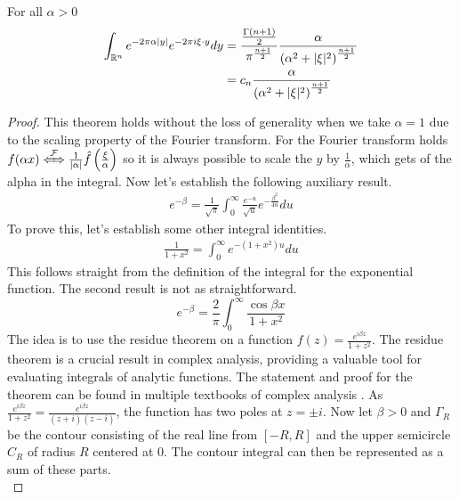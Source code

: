 \begin{theorem}\label{thm:poisson-kernel}
    For all $\alpha>0$ 
    \begin{align*}
        \int_{\mathbb R^{n}}e^{-2\pi\alpha|y|}e^{-2\pi i \xi\cdot y}dy &= \frac{\frac{\Gamma\left(n+1\right)}{2}}{\pi^{\frac{n+1}{2}}}\frac{\alpha}{{(\alpha^2+|\xi|^2)}^{\frac{n+1}{2}}} \\
        &=c_n\frac{\alpha}{{(\alpha^2+|\xi|^2)}^{\frac{n+1}{2}}}
    \end{align*}
\end{theorem}
\begin{proof}
    This theorem holds without the loss of generality when we take $\alpha=1$ due to the scaling property of the Fourier transform. For the Fourier transform holds $f(\alpha x)\xLeftrightarrow{\mathcal{F}}\frac{1}{|\alpha|}\hat{f}\left(\frac{\xi}{\alpha}\right)$ so it is always possible to scale the $y$ by $\frac{1}{\alpha}$, which gets of the alpha in the integral. Now let's establish the following auxiliary result.
    \begin{gather}\label{eq:poisson-kernel1}
        e^{-\beta}=\frac{1}{\sqrt{\pi}}\int_0^\infty \frac{e^{-u}}{\sqrt{u}}e^{-\frac{\beta^2}{4u}}du
    \end{gather}
    To prove this, let's establish some other integral identities.
    \begin{gather*}
        \frac{1}{1+x^2}=\int_0^\infty e^{-(1+x^2)u}du
    \end{gather*}
    This follows straight from the definition of the integral for the exponential function. The second result is not as straightforward. 
    \begin{equation*}
        e^{-\beta}=\frac{2}{\pi}\int_0^\infty\frac{\cos{\beta x}}{1+x^2}
    \end{equation*}
    The idea is to use the residue theorem on a function $f(z)=\frac{e^{i\beta z}}{1+z^2}$. The residue theorem is a crucial result in complex analysis, providing a valuable tool for evaluating integrals of analytic functions. The statement and proof for the theorem can be found in multiple textbooks of complex analysis \cite{Ahlfors1966, Nevalinna, Conway}. As $\frac{e^{i\beta z}}{1+z^2}=\frac{e^{i\beta z}}{(z+i)(z-i)}$, the function has two poles at $z=\pm i$. Now let $\beta>0$ and $\Gamma_R$ be the contour consisting of the real line from $[-R,R]$ and the upper semicircle $C_R$ of radius $R$ centered at $0$. The contour integral can then be represented as a sum of these parts.
    \begin{equation*}

\end{equation*}
\end{proof}
